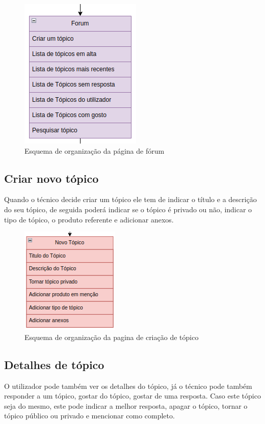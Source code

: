 \begin{figure}[htb]
    \centering
    
    \includegraphics[height=0.4\textwidth]{images/Arquiteturas/superficial_de_app/forum.png}
    \caption{Esquema de organização da página de fórum}
    \label{fig:5}
\end{figure}

\subsection{Criar novo tópico}

Quando o técnico decide criar um tópico ele tem de indicar o título e a descrição do seu tópico, de seguida 
poderá indicar se o tópico é privado ou não, indicar o tipo de tópico, o produto referente e adicionar 
anexos.

\begin{figure}[htb]
    \centering
    
    \includegraphics[height=0.3\textwidth]{images/Arquiteturas/superficial_de_app/criar_topico.png}
    \caption{Esquema de organização da pagina de criação de tópico}
    \label{fig:6}
\end{figure}

\newpage

\subsection{Detalhes de tópico}

O utilizador pode também ver os detalhes do tópico, já o técnico pode também responder a um tópico, 
gostar do tópico, gostar de uma resposta.
Caso este tópico seja do mesmo, este pode indicar a melhor resposta, apagar o tópico, tornar o tópico 
público ou privado e mencionar como completo.


